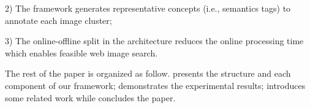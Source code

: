 2) The framework generates representative
concepts (i.e., semantics tags) to annotate each image cluster;

3) The online-offline split in the architecture reduces the online
processing time which enables feasible web image search.

The rest of the paper is organized as follow.
 presents the structure and each component of our
framework;
 demonstrates the experimental results;
 introduces some related work while
 concludes the paper.

